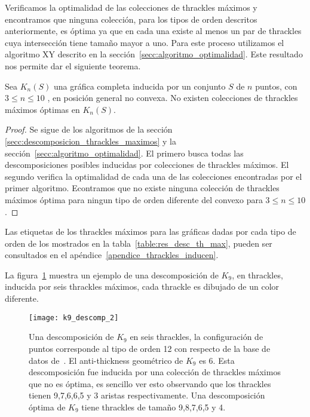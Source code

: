   Verificamos la optimalidad de las colecciones de thrackles máximos y encontramos
  que ninguna colección, para los tipos de orden descritos anteriormente,
  es óptima ya que en cada una existe al menos un par de thrackles cuya intersección tiene
  tamaño mayor a uno. Para este proceso utilizamos el algoritmo XY descrito en la
  sección~\ref{secc:algoritmo_optimalidad}. Este resultado nos permite dar el siguiente teorema.
  \begin{theorem}\label{teo:coleccion_optima}
    Sea $K_n(S)$ una gráfica completa inducida por un conjunto $S$ de $n$ puntos,
    con $3\leq n\leq 10$ , en posición general no convexa. No existen
    colecciones de thrackles máximos óptimas en $K_n(S)$.
  \end{theorem}
  \begin{proof}
    Se sigue de los algoritmos de la sección \ref{secc:descomposicion_thrackles_maximos}
    y la sección~\ref{secc:algoritmo_optimalidad}. El primero busca todas
    las descomposiciones posibles inducidas por colecciones de thrackles máximos.
    El segundo verifica la optimalidad de cada una de las colecciones
    encontradas por el primer algoritmo. Econtramos que no existe ninguna
    colección de thrackles máximos óptima para ningun tipo de orden diferente del convexo para
    $3\leq n\leq 10$.
  \end{proof}

  Las etiquetas de los thrackles máximos para las gráficas dadas por cada
  tipo de orden de los mostrados en la tabla~\ref{table:res_desc_th_max}, pueden
  ser consultados en el apéndice~\ref{apendice_thrackles_inducen}.

  La figura~\ref{fig:k9_descomp} muestra un ejemplo de una
  descomposición de $K_9$, en thrackles, inducida por seis
  thrackles máximos, cada thrackle es dibujado de un color diferente.

  \begin{figure}
    \centering
    \texttt{[image: k9\_descomp\_2]}
    \caption{Una descomposición de $K_9$ en seis thrackles, la configuración de
    puntos corresponde al tipo de orden 12 con respecto de la base de datos
    de~\cite{Aichholzer2001}. El anti-thickness geométrico de $K_9$ es
    6. Esta descomposición fue inducida por una colección
    de thrackles máximos que no es óptima, es sencillo ver esto observando que
    los thrackles tienen 9,7,6,6,5 y 3 aristas respectivamente.
    Una descomposición óptima de $K_9$ tiene thrackles de tamaño 9,8,7,6,5 y 4.}
    \label{fig:k9_descomp}
  \end{figure}


